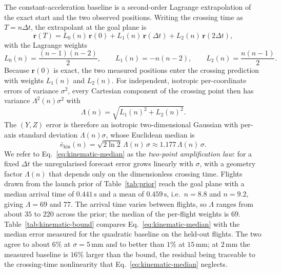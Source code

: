 \documentclass[11pt,a4paper]{article}
\begin{document}
The constant-acceleration baseline is a second-order Lagrange extrapolation of the
exact start and the two observed positions. Writing the crossing time as
$T=n\Delta t$, the extrapolant at the goal plane is
\begin{equation}
  \mathbf{r}(T)=L_0(n)\,\mathbf{r}(0)+L_1(n)\,\mathbf{r}(\Delta t)
  +L_2(n)\,\mathbf{r}(2\Delta t),
\end{equation}
with the Lagrange weights
\begin{equation}
  L_0(n)=\frac{(n-1)(n-2)}{2},\qquad
  L_1(n)=-n(n-2),\qquad
  L_2(n)=\frac{n(n-1)}{2}.
\end{equation}
Because $\mathbf{r}(0)$ is exact, the two measured positions enter the crossing
prediction with weights $L_1(n)$ and $L_2(n)$. For independent, isotropic
per-coordinate errors of variance $\sigma^2$, every Cartesian component of the
crossing point then has variance $\Lambda^2(n)\sigma^2$ with
\begin{equation}
  \Lambda(n)=\sqrt{L_1(n)^2+L_2(n)^2}.
\end{equation}
The $(Y,Z)$ error is therefore an isotropic two-dimensional Gaussian with per-axis
standard deviation $\Lambda(n)\sigma$, whose Euclidean median is
\begin{equation}
  \bar e_{\mathrm{kin}}(n)=\sqrt{2\ln 2}\,\Lambda(n)\,\sigma
  \approx 1.177\,\Lambda(n)\,\sigma .
  \label{eq:kinematic-median}
\end{equation}
We refer to Eq.~\eqref{eq:kinematic-median} as the \emph{two-point amplification law}: for a fixed $\Delta t$ the unregularised forecast error grows linearly with $\sigma$, with a geometry factor $\Lambda(n)$ that depends only on the dimensionless crossing time.
Flights drawn from the launch prior of Table~\ref{tab:prior} reach the goal plane
with a median arrival time of $0.441\,\mathrm{s}$ and a mean of
$0.459\,\mathrm{s}$, i.e.\ $n=8.8$ and $n=9.2$, giving $\Lambda=69$ and $77$.
The arrival time varies between flights, so $\Lambda$ ranges from about $35$ to
$220$ across the prior; the median of the per-flight weights is $69$.  Table~\ref{tab:kinematic-bound}
compares Eq.~\eqref{eq:kinematic-median} with the median error measured for the
quadratic baseline on the held-out flights.  The two agree to about $6\%$ at
$\sigma=5\,\mathrm{mm}$ and to better than $1\%$ at $15\,\mathrm{mm}$; at
$2\,\mathrm{mm}$ the measured baseline is $16\%$ larger than the bound, the
residual being traceable to the crossing-time nonlinearity that Eq.~\eqref{eq:kinematic-median}
neglects.
\end{document}
